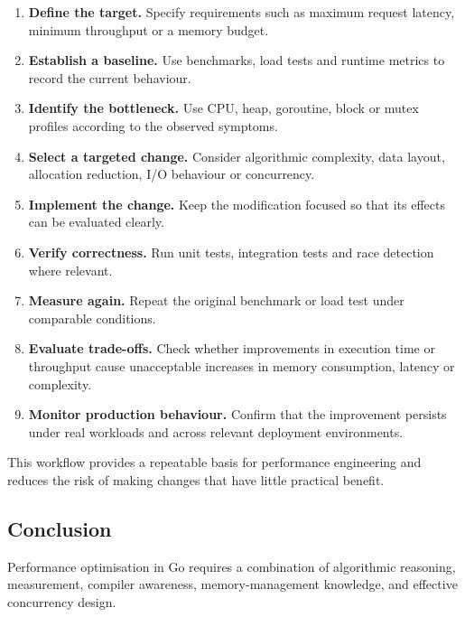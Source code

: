 \begin{enumerate}
    \item \textbf{Define the target.} Specify requirements such as maximum request latency, minimum throughput or a memory budget.

    \item \textbf{Establish a baseline.} Use benchmarks, load tests and runtime metrics to record the current behaviour.

    \item \textbf{Identify the bottleneck.} Use CPU, heap, goroutine, block or mutex profiles according to the observed symptoms.

    \item \textbf{Select a targeted change.} Consider algorithmic complexity, data layout, allocation reduction, I/O behaviour or concurrency.

    \item \textbf{Implement the change.} Keep the modification focused so that its effects can be evaluated clearly.

    \item \textbf{Verify correctness.} Run unit tests, integration tests and race detection where relevant.

    \item \textbf{Measure again.} Repeat the original benchmark or load test under comparable conditions.

    \item \textbf{Evaluate trade-offs.} Check whether improvements in execution time or throughput cause unacceptable increases in memory consumption, latency or complexity.

    \item \textbf{Monitor production behaviour.} Confirm that the improvement persists under real workloads and across relevant deployment environments.
\end{enumerate}

This workflow provides a repeatable basis for performance engineering and reduces the risk of making changes that have little practical benefit.

\subsection{Conclusion}

Performance optimisation in Go requires a combination of algorithmic reasoning, measurement, compiler awareness, memory-management knowledge, and effective concurrency design.\\


